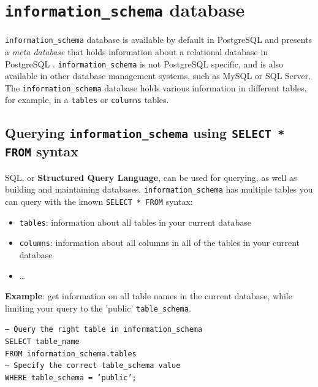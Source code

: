 \documentclass[11pt]{article}
\begin{document}
    \section{\texttt{information\_schema} database} \label{sec:info_schema}

    \texttt{information\_schema} database is available by default in PostgreSQL and presents a \textit{meta database} that holds information about a relational database in PostgreSQL .
    \texttt{information\_schema} is not PostgreSQL specific, and is also available in other database management systems, such as MySQL or SQL Server.
    The \texttt{information\_schema} database holds various information in different tables, for example, in a \texttt{tables} or \texttt{columns} tables.

    \subsection{Querying \texttt{information\_schema} using \texttt{SELECT * FROM} syntax} \label{subsec:info_schema_q}

    SQL, or \textbf{Structured Query Language}, can be used for querying, as well as building and maintaining databases.
    \texttt{information\_schema} has multiple tables you can query with the known \texttt{SELECT * FROM} syntax:

    \begin{itemize}
        \item \texttt{tables}: information about all tables in your current database
        \item \texttt{columns}: information about all columns in all of the tables in your current database
        \item \ldots
    \end{itemize}

    \vspace{5mm}

    \textbf{Example}: get information on all table names in the current database, while limiting your query to the 'public' \texttt{table\_schema}.

    \vspace{5mm}

    \texttt{-- Query the right table in information\_schema \\
    SELECT table\_name \\
    FROM information\_schema.tables \\
    -- Specify the correct table\_schema value \\
    WHERE table\_schema = 'public';}
\end{document}
